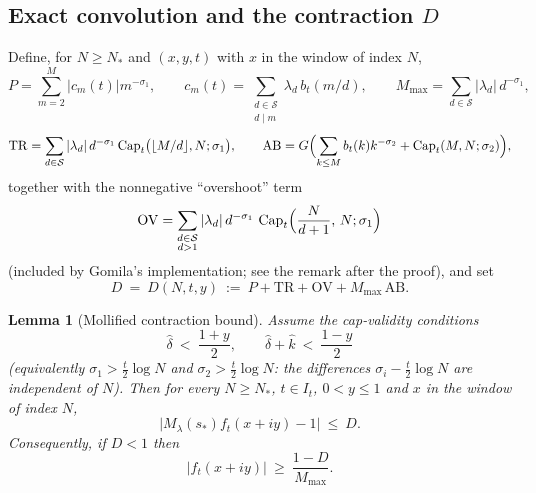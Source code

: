 \documentclass[11pt]{article}
\newtheorem{lemma}[theorem]{Lemma}
\theoremstyle{definition}
\newcommand{\calS}{\mathcal{S}}
\newcommand{\CapT}{\operatorname{Cap}}
\begin{document}
\subsection{Exact convolution and the contraction $D$}

Define, for $N\ge N_*$ and $(x,y,t)$ with $x$ in the window of index
$N$,
\[
P=\sum_{m=2}^{M}|c_m(t)|m^{-\sigma_1},
\qquad
c_m(t)=\sum_{\substack{d\in\calS\\ d\mid m}}\lambda_d\,b_t(m/d),
\qquad
M_{\max}=\sum_{d\in\calS}|\lambda_d|\,d^{-\sigma_1},
\]
\[
\mathrm{TR}=\sum_{d\in\calS}|\lambda_d|\,d^{-\sigma_1}
\CapT_t\bigl(\lfloor M/d\rfloor,N;\sigma_1\bigr),
\qquad
\mathrm{AB}=G\Bigl(\sum_{k\le M}b_t(k)k^{-\sigma_2}
+\CapT_t(M,N;\sigma_2)\Bigr),
\]
together with the nonnegative ``overshoot'' term
\[
\mathrm{OV}=\sum_{\substack{d\in\calS\\ d>1}}
|\lambda_d|\,d^{-\sigma_1}\,
\CapT_t\Bigl(\frac{N}{d+1},\,N;\sigma_1\Bigr)
\]
(included by Gomila's implementation; see the remark after the
proof), and set
\begin{equation}\label{eq:D}
D\ =\ D(N,t,y)\ :=\ P+\mathrm{TR}+\mathrm{OV}+M_{\max}\,\mathrm{AB}.
\end{equation}

\begin{lemma}[Mollified contraction bound]\label{lem:contraction}
Assume the cap-validity conditions
\begin{equation}\label{eq:capvalid}
\widehat\delta\ <\ \frac{1+y}2,
\qquad
\widehat\delta+\widehat k\ <\ \frac{1-y}2
\end{equation}
(equivalently $\sigma_1>\frac t2\log N$ and
$\sigma_2>\frac t2\log N$: the differences
$\sigma_i-\frac t2\log N$ are independent of $N$). Then for every
$N\ge N_*$, $t\in I_t$, $0<y\le1$ and $x$ in the window of index
$N$,
\[
\bigl|M_\lambda(s_*)f_t(x+iy)-1\bigr|\ \le\ D .
\]
Consequently, if $D<1$ then
\begin{equation}\label{eq:flowlower}
|f_t(x+iy)|\ \ge\ \frac{1-D}{M_{\max}} .
\end{equation}
\end{lemma}
\end{document}
